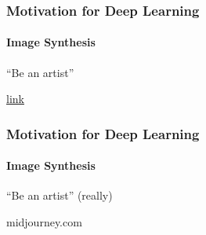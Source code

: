 \documentclass[xetex,professionalfont]{beamer}
\begin{document}
\begin{frame}
\frametitle{Motivation for Deep Learning}
\framesubtitle{Image Synthesis}

\begin{center}
    \enquote{Be an artist} 
\end{center}



\smallskip

\begin{center}
    {\centering\href{http://genekogan.com/works/style-transfer/}{link}}
\end{center}

\end{frame}


\begin{frame}
\frametitle{Motivation for Deep Learning}
\framesubtitle{Image Synthesis}

\begin{center}
    \enquote{Be an artist} (really)
\end{center}

\smallskip

\begin{center}
    {\centering midjourney.com}
\end{center}

\end{frame}
\end{document}
